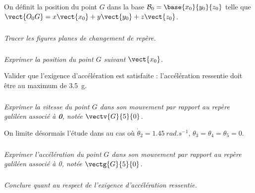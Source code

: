 \begin{multicols}{2}
On définit la position du point $G$ dans la base $\mathcal{B}_0 = \base{x_0}{y_0}{z_0}$ telle que $\vect{O_0 G} = x\vect{x_0}+y\vect{y_0}+z\vect{z_0}$.
 
\subparagraph{}
\textit{Tracer les figures planes de changement de repère.}
\ifprof
\begin{corrige}
\end{corrige}
\else\fi


\subparagraph{}
\textit{Exprimer la position du point $G$ suivant $\vect{x_0}$.}
\ifprof
\begin{corrige}
\end{corrige}
\else\fi

\begin{obj}
Valider que l'exigence d'accélération est satisfaite : l'accélération ressentie doit être au maximum de \SI{3,5}{g}.
\end{obj}



\subparagraph{}
\textit{Exprimer la vitesse du point $G$ dans son mouvement par rapport au repère galiléen associé à \textbf{0}, notée $\vectv{G}{5}{0}$.}
\ifprof
\begin{corrige}
\end{corrige}
\else\fi

On limite désormais l'étude dans au cas où $\dot{\theta}_2 = \SI{1,45}{rad.s^{-1}}$, ${\theta}_3={\theta}_4={\theta}_5=0$.


\subparagraph{}
\textit{Exprimer l’accélération du point $G$ dans son mouvement par rapport au repère galiléen associé à 0, notée $\vectg{G}{5}{0}$.}
\ifprof
\begin{corrige}
\end{corrige}
\else\fi

\subparagraph{}
\textit{Conclure quant au respect de l'exigence d'accélération ressentie. }
\ifprof
\begin{corrige}
\end{corrige}
\else\fi



\ifprof
\else
\end{multicols}
\fi


